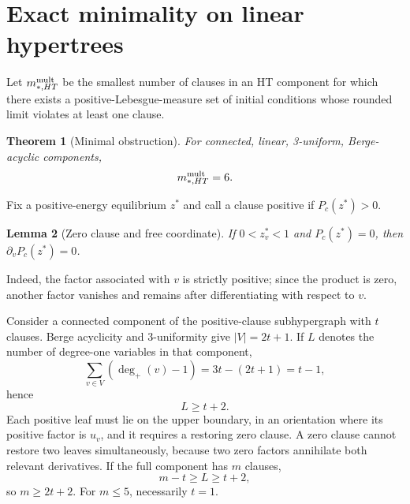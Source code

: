 \documentclass[11pt,a4paper]{article}
\newtheorem{theorem}{Theorem}[section]
\newtheorem{lemma}[theorem]{Lemma}
\begin{document}
\section{Exact minimality on linear hypertrees}
Let $m_{*,HT}^{\rm mult}$ be the smallest number of clauses in an HT component for which there exists a positive-Lebesgue-measure set of initial conditions whose rounded limit violates at least one clause.

\begin{theorem}[Minimal obstruction]
For connected, linear, 3-uniform, Berge-acyclic components,
\[
m_{*,HT}^{\rm mult}=6.
\]
\end{theorem}

Fix a positive-energy equilibrium $z^*$ and call a clause positive if $P_c(z^*)>0$.

\begin{lemma}[Zero clause and free coordinate]
If $0<z_v^*<1$ and $P_c(z^*)=0$, then $\partial_vP_c(z^*)=0$.
\end{lemma}
\noindent Indeed, the factor associated with $v$ is strictly positive; since the product is zero, another factor vanishes and remains after differentiating with respect to $v$.

Consider a connected component of the positive-clause subhypergraph with $t$ clauses. Berge acyclicity and 3-uniformity give $|V|=2t+1$. If $L$ denotes the number of degree-one variables in that component,
\[
\sum_{v\in V}(\deg_+(v)-1)=3t-(2t+1)=t-1,
\]
hence
\begin{equation}
L\ge t+2.
\end{equation}
Each positive leaf must lie on the upper boundary, in an orientation where its positive factor is $u_v$, and it requires a restoring zero clause. A zero clause cannot restore two leaves simultaneously, because two zero factors annihilate both relevant derivatives. If the full component has $m$ clauses,
\[
m-t\ge L\ge t+2,
\]
so $m\ge2t+2$. For $m\le5$, necessarily $t=1$.
\end{document}
